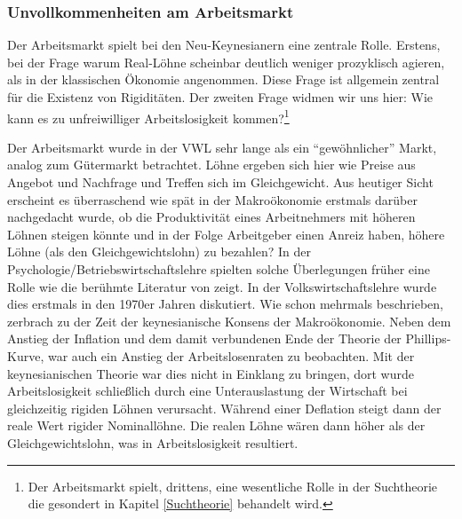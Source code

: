 \subsubsection{Unvollkommenheiten am Arbeitsmarkt}
\label{RR_AM}

Der Arbeitsmarkt spielt bei den Neu-Keynesianern eine zentrale Rolle. Erstens, bei der Frage warum Real-Löhne scheinbar deutlich weniger prozyklisch agieren, als in der klassischen Ökonomie angenommen. Diese Frage ist allgemein zentral für die Existenz von Rigiditäten. Der zweiten Frage widmen wir uns hier: Wie kann es zu unfreiwilliger Arbeitslosigkeit kommen?\footnote{Der Arbeitsmarkt spielt, drittens, eine wesentliche Rolle in der Suchtheorie die gesondert in Kapitel \ref{Suchtheorie} behandelt wird.}

Der Arbeitsmarkt wurde in der VWL sehr lange als ein "`gewöhnlicher"' Markt, analog zum Gütermarkt betrachtet. Löhne ergeben sich hier wie Preise aus Angebot und Nachfrage und Treffen sich im Gleichgewicht. Aus heutiger Sicht erscheint es überraschend wie spät in der Makroökonomie erstmals darüber nachgedacht wurde, ob die Produktivität eines Arbeitnehmers mit höheren Löhnen steigen könnte und in der Folge Arbeitgeber einen Anreiz haben, höhere Löhne (als den Gleichgewichtslohn) zu bezahlen? In der Psychologie/Betriebswirtschaftslehre spielten solche Überlegungen früher eine Rolle wie die berühmte Literatur von \textcite{Maslow1943, Herzberg1966, McClelland1961, McGregor1960} zeigt. In der Volkswirtschaftslehre wurde dies erstmals in den 1970er Jahren diskutiert. Wie schon mehrmals beschrieben, zerbrach zu der Zeit der keynesianische Konsens der Makroökonomie. Neben dem Anstieg der Inflation und dem damit verbundenen Ende der Theorie der Phillips-Kurve, war auch ein Anstieg der Arbeitslosenraten zu beobachten. Mit der keynesianischen Theorie war dies nicht in Einklang zu bringen, dort wurde Arbeitslosigkeit schließlich durch eine Unterauslastung der Wirtschaft bei gleichzeitig rigiden Löhnen verursacht. Während einer Deflation steigt dann der reale Wert rigider Nominallöhne. Die realen Löhne wären dann höher als der Gleichgewichtslohn, was in Arbeitslosigkeit resultiert.

